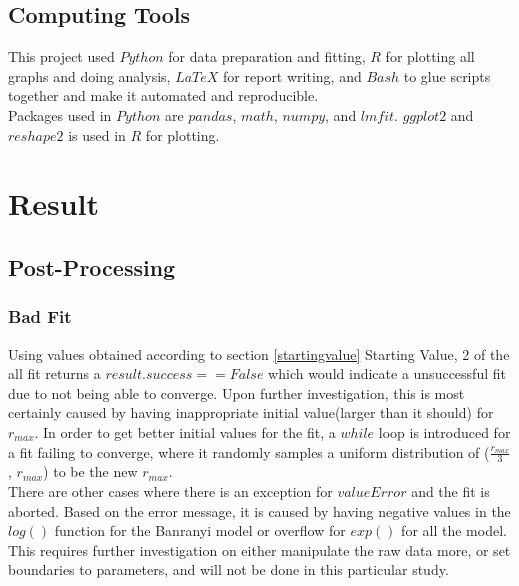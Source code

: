 \documentclass[11pt]{article}
\begin{document}
\subsection{Computing Tools}
This project used $Python$ for data preparation and fitting, $R$ for plotting all graphs and doing analysis, $LaTeX$ for report writing, and $Bash$ to glue scripts together and make it automated and reproducible.\\
Packages used in $Python$ are $pandas$, $math$, $numpy$, and $lmfit$. $ggplot2$ and $reshape2$ is used in $R$ for plotting.

\section{Result}
\subsection{Post-Processing}
\subsubsection{Bad Fit}
Using values obtained according to section \ref{startingvalue} Starting Value, 2 of the all fit returns a $result.success == False$ which would indicate a unsuccessful fit due to not being able to converge. Upon further investigation, this is most certainly caused by having inappropriate initial value(larger than it should) for $r_{max}$. In order to get better initial values for the fit, a $while$ loop is introduced for a fit failing to converge, where it randomly samples a uniform distribution of ($\frac{r_{max}}{3}$ , $r_{max}$) to be the new $r_{max}$.\\
There are other cases where there is an exception for $valueError$ and the fit is aborted. Based on the error message, it is caused by having negative values in the $log()$ function for the Banranyi model or overflow for $exp()$ for all the model. This requires further investigation on either manipulate the raw data more, or set boundaries to parameters, and will not be done in this particular study.
\end{document}

